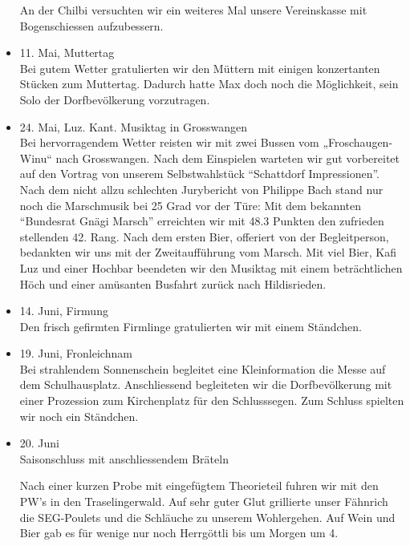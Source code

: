 \begin{history}
\begin{itemize}
              An der Chilbi versuchten wir ein weiteres Mal unsere Vereinskasse mit
              Bogenschiessen aufzubessern.

        \item 11. Mai, Muttertag\\
              Bei gutem Wetter gratulierten wir den Müttern mit einigen konzertanten
              Stücken zum Muttertag. Dadurch hatte Max doch noch die Möglichkeit, sein
              Solo der Dorfbevölkerung vorzutragen.

        \item 24. Mai, Luz. Kant. Musiktag in Grosswangen\\
              Bei hervorragendem Wetter reisten wir mit zwei Bussen vom „Froschaugen-
              Winu“ nach Grosswangen. Nach dem Einspielen warteten wir gut vorbereitet
              auf den Vortrag von unserem Selbstwahlstück \enquote{Schattdorf
                  Impressionen}. Nach dem nicht allzu schlechten Jurybericht von Philippe
              Bach stand nur noch die Marschmusik bei 25 Grad vor der Türe: Mit dem
              bekannten \enquote{Bundesrat Gnägi Marsch} erreichten wir mit 48.3
              Punkten den zufrieden stellenden 42. Rang. Nach dem ersten Bier,
              offeriert von der Begleitperson, bedankten wir uns mit der
              Zweitaufführung vom Marsch. Mit viel Bier, Kafi Luz und einer Hochbar
              beendeten wir den Musiktag mit einem beträchtlichen Höch und einer
              amüsanten Busfahrt zurück nach Hildisrieden.

        \item 14. Juni,  Firmung\\
              Den frisch gefirmten Firmlinge gratulierten wir mit einem Ständchen.

        \item 19. Juni, Fronleichnam\\
              Bei strahlendem Sonnenschein begleitet eine Kleinformation die Messe auf
              dem Schulhausplatz. Anschliessend begleiteten wir die Dorfbevölkerung
              mit einer Prozession zum Kirchenplatz für den Schlusssegen. Zum Schluss
              spielten wir noch ein Ständchen.

        \item 20. Juni\\
              Saisonschluss mit anschliessendem Bräteln

              Nach einer kurzen Probe mit eingefügtem Theorieteil fuhren wir mit den
              PW's in den Traselingerwald. Auf sehr guter Glut grillierte unser
              Fähnrich die SEG-Poulets und die Schläuche zu unserem Wohlergehen. Auf
              Wein und Bier gab es für wenige nur noch Herrgöttli bis um Morgen um 4.


\end{itemize}
\end{history}
